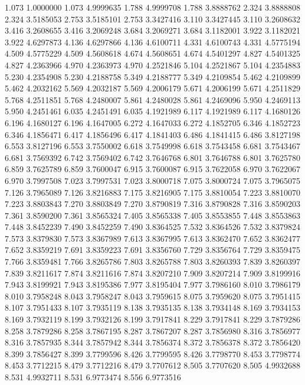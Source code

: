 1.073 1.0000000
1.073 4.9999635
1.788 4.9999708
1.788 3.8888762
2.324 3.8888808
2.324 3.5185053
2.753 3.5185101
2.753 3.3427416
3.110 3.3427445
3.110 3.2608632
3.416 3.2608655
3.416 3.2069248
3.684 3.2069271
3.684 3.1182001
3.922 3.1182021
3.922 4.6297873
4.136 4.6297866
4.136 4.6100711
4.331 4.6100743
4.331 4.5775194
4.509 4.5775229
4.509 4.5608618
4.674 4.5608651
4.674 4.5401297
4.827 4.5401325
4.827 4.2363966
4.970 4.2363973
4.970 4.2521846
5.104 4.2521867
5.104 4.2354883
5.230 4.2354908
5.230 4.2188758
5.349 4.2188777
5.349 4.2109854
5.462 4.2109899
5.462 4.2032162
5.569 4.2032187
5.569 4.2006179
5.671 4.2006199
5.671 4.2511829
5.768 4.2511851
5.768 4.2480007
5.861 4.2480028
5.861 4.2469096
5.950 4.2469113
5.950 4.2451461
6.035 4.2451491
6.035 4.1921989
6.117 4.1921989
6.117 4.1680126
6.196 4.1680127
6.196 4.1647005
6.272 4.1647033
6.272 4.1852705
6.346 4.1852723
6.346 4.1856471
6.417 4.1856496
6.417 4.1841403
6.486 4.1841415
6.486 3.8127198
6.553 3.8127196
6.553 3.7550002
6.618 3.7549998
6.618 3.7543458
6.681 3.7543467
6.681 3.7569392
6.742 3.7569402
6.742 3.7646768
6.801 3.7646788
6.801 3.7625780
6.859 3.7625789
6.859 3.7600047
6.915 3.7600087
6.915 3.7622058
6.970 3.7622067
6.970 3.7997508
7.023 3.7997531
7.023 3.8000718
7.075 3.8000724
7.075 3.7965075
7.126 3.7965089
7.126 3.8216883
7.175 3.8216905
7.175 3.8810054
7.223 3.8810070
7.223 3.8803843
7.270 3.8803849
7.270 3.8790819
7.316 3.8790828
7.316 3.8590203
7.361 3.8590200
7.361 3.8565324
7.405 3.8565338
7.405 3.8553855
7.448 3.8553863
7.448 3.8452239
7.490 3.8452259
7.490 3.8364525
7.532 3.8364526
7.532 3.8379824
7.573 3.8379830
7.573 3.8367989
7.613 3.8367995
7.613 3.8362470
7.652 3.8362477
7.652 3.8359219
7.691 3.8359223
7.691 3.8356760
7.729 3.8356764
7.729 3.8359475
7.766 3.8359481
7.766 3.8265786
7.803 3.8265788
7.803 3.8260393
7.839 3.8260397
7.839 3.8211617
7.874 3.8211616
7.874 3.8207210
7.909 3.8207214
7.909 3.8199916
7.943 3.8199921
7.943 3.8195386
7.977 3.8195404
7.977 3.7986160
8.010 3.7986179
8.010 3.7958248
8.043 3.7958247
8.043 3.7959615
8.075 3.7959620
8.075 3.7951415
8.107 3.7951433
8.107 3.7935119
8.138 3.7935135
8.138 3.7934148
8.169 3.7934153
8.169 3.7932119
8.199 3.7932126
8.199 3.7917841
8.229 3.7917841
8.229 3.7879286
8.258 3.7879286
8.258 3.7867195
8.287 3.7867207
8.287 3.7856980
8.316 3.7856977
8.316 3.7857935
8.344 3.7857942
8.344 3.7856374
8.372 3.7856378
8.372 3.7856420
8.399 3.7856427
8.399 3.7799596
8.426 3.7799595
8.426 3.7798770
8.453 3.7798774
8.453 3.7712215
8.479 3.7712216
8.479 3.7707612
8.505 3.7707620
8.505 4.9932688
8.531 4.9932711
8.531 6.9773474
8.556 6.9773516
